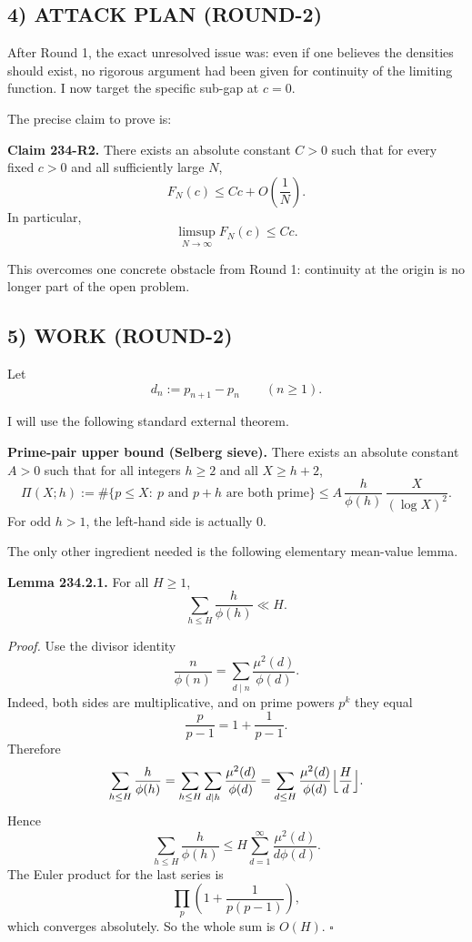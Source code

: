 \subsection*{4) ATTACK PLAN (ROUND-2)}

After Round 1, the exact unresolved issue was: even if one believes the densities should exist, no rigorous argument had been given for continuity of the limiting function. I now target the specific sub-gap at $c=0$.

The precise claim to prove is:

\medskip
\noindent
\textbf{Claim 234-R2.} There exists an absolute constant $C>0$ such that for every fixed $c>0$ and all sufficiently large $N$,
\[
F_N(c)\le Cc+O\!\left(\frac{1}{N}\right).
\]
In particular,
\[
\limsup_{N\to\infty}F_N(c)\le Cc.
\]
\medskip

This overcomes one concrete obstacle from Round 1: continuity at the origin is no longer part of the open problem.

\subsection*{5) WORK (ROUND-2)}

Let
\[
d_n:=p_{n+1}-p_n
\qquad (n\ge 1).
\]

I will use the following standard external theorem.

\medskip
\noindent
\textbf{Prime-pair upper bound (Selberg sieve).}
There exists an absolute constant $A>0$ such that for all integers $h\ge 2$ and all $X\ge h+2$,
\[
\Pi(X;h):=\#\{p\le X:\ p\text{ and }p+h\text{ are both prime}\}
\le
A\,\frac{h}{\phi(h)}\,\frac{X}{(\log X)^2}.
\]
For odd $h>1$, the left-hand side is actually $0$.
\medskip

The only other ingredient needed is the following elementary mean-value lemma.

\medskip
\noindent
\textbf{Lemma 234.2.1.}
For all $H\ge 1$,
\[
\sum_{h\le H}\frac{h}{\phi(h)}\ll H.
\]

\emph{Proof.}
Use the divisor identity
\[
\frac{n}{\phi(n)}=\sum_{d\mid n}\frac{\mu^2(d)}{\phi(d)}.
\]
Indeed, both sides are multiplicative, and on prime powers $p^k$ they equal
\[
\frac{p}{p-1}=1+\frac{1}{p-1}.
\]
Therefore
\[
\sum_{h\le H}\frac{h}{\phi(h)}
=
\sum_{h\le H}\sum_{d\mid h}\frac{\mu^2(d)}{\phi(d)}
=
\sum_{d\le H}\frac{\mu^2(d)}{\phi(d)}\Bigl\lfloor\frac{H}{d}\Bigr\rfloor.
\]
Hence
\[
\sum_{h\le H}\frac{h}{\phi(h)}
\le
H\sum_{d=1}^{\infty}\frac{\mu^2(d)}{d\phi(d)}.
\]
The Euler product for the last series is
\[
\prod_{p}\left(1+\frac{1}{p(p-1)}\right),
\]
which converges absolutely. So the whole sum is $O(H)$.
\hfill$\square$
\medskip

